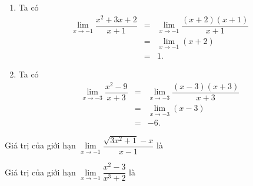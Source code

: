 \begin{ex}
{\begin{enumerate}
\begin{eqnarray*}
				&=& \dfrac{-1}{-3}  = \dfrac{1}{3}.
			\end{eqnarray*}
			\item Ta có 
			\begin{eqnarray*}
				\displaystyle\lim_{x  \to -1} \dfrac{x^2+3x+2}{x+1}
				&=& \displaystyle\lim_{x  \to -1} \dfrac{(x+2)(x+1)}{x+1} \\
				 &=& \displaystyle\lim_{x \to -1} (x+2)\\
				&=&  1.
			\end{eqnarray*}
			\item  Ta có
			\begin{eqnarray*}
				\displaystyle\lim_{x  \to -3} \dfrac{x^2-9}{x+3}
				&=& \displaystyle\lim_{x \to  -3} \dfrac{(x-3)(x+3)}{x+3} \\
				&=&  \displaystyle\lim_{x \to -3} (x-3) \\
				&=& -6. 
			\end{eqnarray*}
		\end{enumerate}
	 }
\end{ex}

\begin{ex}%
	Giá trị của giới hạn  $\lim\limits_{x\to-1}\dfrac{\sqrt{3x^2+1}-x}{x-1}$ là
\end{ex}

\begin{ex}%
	 Giá trị của giới hạn $\lim\limits_{x\to-1}\dfrac{x^2-3}{x^3+2}$ là
\end{ex}

